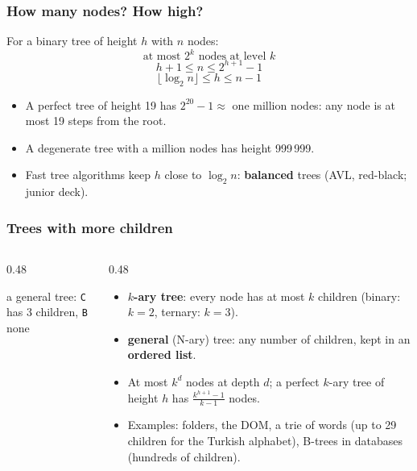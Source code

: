 \documentclass[aspectratio=169,10pt,compress]{beamer}
\begin{document}
\begin{frame}[t,fragile] \frametitle{How many nodes? How high?}
  For a binary tree of height $h$ with $n$ nodes:
  \[
  	\text{at most } 2^{k} \text{ nodes at level } k
  \]
  \[
  	h + 1 \le n \le 2^{h+1} - 1
  \]
  \[
  	\lfloor \log_{2} n \rfloor \le h \le n - 1
  \]
  \begin{itemize}\small
    \item A perfect tree of height 19 has $2^{20} - 1 \approx$ one million nodes: any node is at most 19 steps from the root.
    \item A degenerate tree with a million nodes has height 999\,999.
    \item Fast tree algorithms keep $h$ close to $\log_{2} n$: \textbf{balanced} trees (AVL, red-black; junior deck).
  \end{itemize}
\end{frame}





\begin{frame}[t,fragile] \frametitle{Trees with more children}
  \begin{columns}[T]
    \begin{column}{0.48\textwidth}
      \begin{center}
      \end{center}
      \small a general tree: \texttt{C} has 3 children, \texttt{B} none
    \end{column}
    \begin{column}{0.48\textwidth}
      \begin{itemize}\small
        \item \textbf{$k$-ary tree}: every node has at most $k$ children (binary: $k = 2$, ternary: $k = 3$).
        \item \textbf{general} (N-ary) tree: any number of children, kept in an \textbf{ordered list}.
        \item At most $k^{d}$ nodes at depth $d$; a perfect $k$-ary tree of height $h$ has $\frac{k^{h+1} - 1}{k - 1}$ nodes.
        \item Examples: folders, the DOM, a trie of words (up to 29 children for the Turkish alphabet), B-trees in databases (hundreds of children).
      \end{itemize}
    \end{column}
  \end{columns}
\end{frame}
\end{document}

